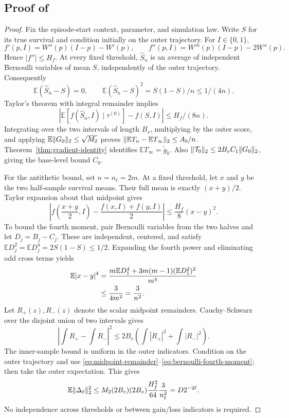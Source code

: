 \documentclass[11pt]{article}
\newcommand{\E}{\mathbb E}
\newcommand{\1}{\mathbf 1}
\DeclarePairedDelimiter{\norm}{\lVert}{\rVert}
\theoremstyle{definition}
\begin{document}
\subsection{Proof of \texorpdfstring{}{the antithetic estimator proposition}}
\begin{proof}
Fix the episode-start context, parameter, and simulation law. Write $S$ for its true survival and condition initially on the outer trajectory. For $I\in\{0,1\}$,
\[
 f'(p,I)=W''(p)(I-p)-W'(p),\qquad
 f''(p,I)=W'''(p)(I-p)-2W''(p).
\]
Hence $|f''|\le H_f$. At every fixed threshold, $\widehat S_n$ is an average of independent Bernoulli variables of mean $S$, independently of the outer trajectory. Consequently
\[
 \E(\widehat S_n-S)=0,\qquad
 \E(\widehat S_n-S)^2=S(1-S)/n\le1/(4n).
\]
Taylor's theorem with integral remainder implies
\[
 |\E[f(\widehat S_n,I)\mid\tau^{(0)}]-f(S,I)|
 \le H_f/(8n).
\]
Integrating over the two intervals of length $B_v$, multiplying by the outer score, and applying $\E\norm{G_0}_2\le\sqrt{M_2}$ proves
$\norm{\E T_n-\E T_\infty}_2\le A_b/n$.
Theorem~\ref{thm:gradient-identity} identifies $\E T_\infty=\widetilde g_k$. Also $\norm{\mathcal T_0}_2\le2B_vC_1\norm{G_0}_2$, giving the base-level bound $C_0$.

For the antithetic bound, set $n=n_\ell=2m$. At a fixed threshold, let $x$ and $y$ be the two half-sample survival means. Their full mean is exactly $(x+y)/2$. Taylor expansion about that midpoint gives
\begin{equation}\label{eq:midpoint-remainder}
 \left|f\left(\frac{x+y}2,I\right)-\frac{f(x,I)+f(y,I)}2\right|
 \le\frac{H_f}{8}(x-y)^2.
\end{equation}
To bound the fourth moment, pair Bernoulli variables from the two halves and let $D_j=B_j-C_j$. These are independent, centered, and satisfy
$\E D_j^2=\E D_j^4=2S(1-S)\le1/2$. Expanding the fourth power and eliminating odd cross terms yields
\begin{align}
 \E|x-y|^4
 &=\frac{m\E D_1^4+3m(m-1)(\E D_1^2)^2}{m^4}\notag\\
 &\le\frac{3}{4m^2}=\frac3{n^2}.
 \label{eq:bernoulli-fourth-moment}
\end{align}
Let $R_+(z),R_-(z)$ denote the scalar midpoint remainders. Cauchy--Schwarz over the disjoint union of two intervals gives
\[
 \left|\int R_+-\int R_-\right|^2
 \le2B_v\left(\int|R_+|^2+\int|R_-|^2\right).
\]
The inner-sample bound is uniform in the outer indicators. Condition on the outer trajectory and use \eqref{eq:midpoint-remainder}--\eqref{eq:bernoulli-fourth-moment}; then take the outer expectation. This gives
\[
 \E\norm{\Delta_\ell}_2^2
 \le M_2(2B_v)(2B_v)\frac{H_f^2}{64}\frac3{n_\ell^2}
 =D2^{-2\ell}.
\]
No independence across thresholds or between gain/loss indicators is required.


\end{proof}
\end{document}
